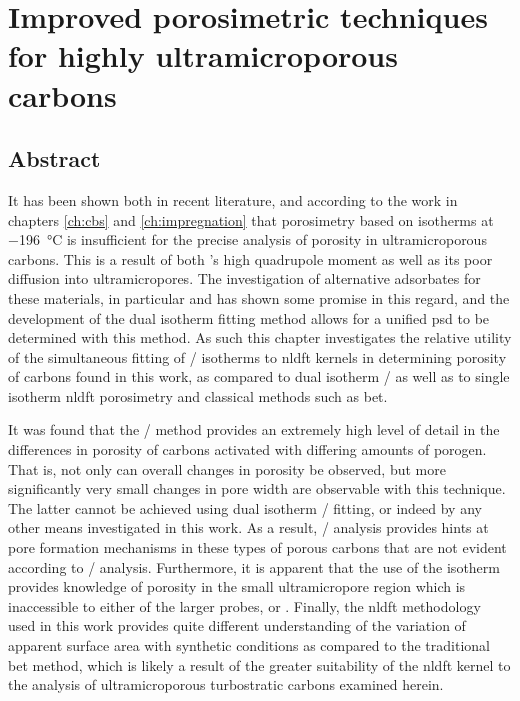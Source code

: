 \chapter{Improved porosimetric techniques for highly ultramicroporous carbons}
\label{ch:dual_isotherm}

\newpage
\section*{Abstract}
It has been shown both in recent literature, and according to the work in chapters \ref{ch:cbs} and \ref{ch:impregnation} that porosimetry based on  isotherms at \qty{-196}{\degreeCelsius} is insufficient for the precise analysis of porosity in ultramicroporous carbons. This is a result of both 's high quadrupole moment as well as its poor diffusion into \glspl{ultramicropore}. The investigation of alternative \glspl{adsorbate} for these materials, in particular  and  has shown some promise in this regard, and the development of the dual isotherm fitting method allows for a unified \acrshort{psd} to be determined with this method. As such this chapter investigates the relative utility of the simultaneous fitting of / isotherms to \acrfull{nldft} kernels in determining porosity of carbons found in this work, as compared to dual isotherm / as well as to single isotherm \acrshort{nldft} porosimetry and classical methods such as \acrshort{bet}. 

It was found that the / method provides an extremely high level of detail in the differences in porosity of carbons activated with differing amounts of \gls{porogen}. That is, not only can overall changes in porosity be observed, but more significantly very small changes in pore width are observable with this technique. The latter cannot be achieved using dual isotherm / fitting, or indeed by any other means investigated in this work. As a result, / analysis provides hints at pore formation mechanisms in these types of porous carbons that are not evident according to / analysis. Furthermore, it is apparent that the use of the  isotherm provides knowledge of porosity in the small \gls{ultramicropore} region which is inaccessible to either of the larger probes,  or . Finally, the \acrshort{nldft} methodology used in this work provides quite different understanding of the variation of apparent surface area with synthetic conditions as compared to the traditional \acrshort{bet} method, which is likely a result of the greater suitability of the \acrshort{nldft} kernel to the analysis of ultramicroporous \glspl{turbostratic carbon} examined herein.
 
